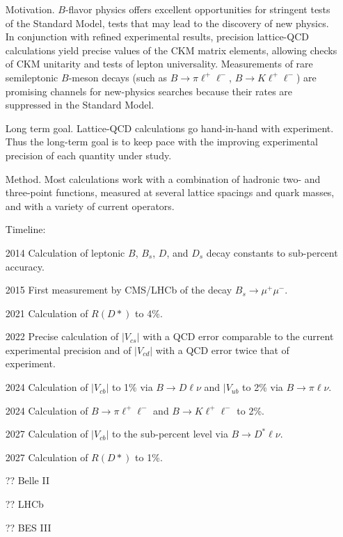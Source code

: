 \documentclass{article}
\begin{document}
\begin{itemize}
    \item[Motivation.] $B$-flavor physics offers excellent opportunities for stringent tests of the Standard Model, tests that may lead to the discovery of new physics. In conjunction with refined experimental results, precision lattice-QCD calculations yield precise values of the CKM matrix elements, allowing checks of CKM unitarity and tests of lepton universality. Measurements of rare semileptonic $B$-meson decays (such as $B\to\pi\ell^+\ell^-$, $B\to K\ell^+\ell^-$) are promising channels for new-physics searches because their rates are suppressed in the Standard Model.
    \item[Long term goal.] Lattice-QCD calculations go hand-in-hand with experiment.  Thus the long-term goal is to keep pace with the improving experimental precision of each quantity under study.
    \item[Method.] Most calculations work with a combination of hadronic two- and three-point functions, measured at several lattice spacings and quark masses, and with a variety of current operators. 
\item[Timeline:]
    \item[2014] Calculation of leptonic $B$, $B_s$, $D$, and $D_s$ decay constants to sub-percent accuracy.
    \item[2015] First measurement by CMS/LHCb of the decay $B_s \to \mu^+\mu^-$.
    \item[2021] Calculation of $R(D*)$ to 4\%.
    \item[2022] Precise calculation of $|V_{cs}|$ with a QCD error comparable to the current experimental precision and of $|V_{cd}|$ with a QCD error twice that of experiment.
    \item[2024] Calculation of $|V_{cb}|$ to 1\% via $B\to D\ell\nu$ and $|V_{ub}$ to 2\% via $B\to \pi\ell\nu$.
    \item[2024] Calculation of $B\to\pi \ell^+\ell^-$ and $B\to K \ell^+\ell^-$ to 2\%.
    \item[2027] Calculation of $|V_{cb}|$ to the sub-percent level via $B\to D^*\ell\nu$.
    \item[2027] Calculation of $R(D*)$ to 1\%.
    \item[??] Belle II
    \item[??] LHCb
    \item[??] BES III
\end{itemize}
\end{document}
